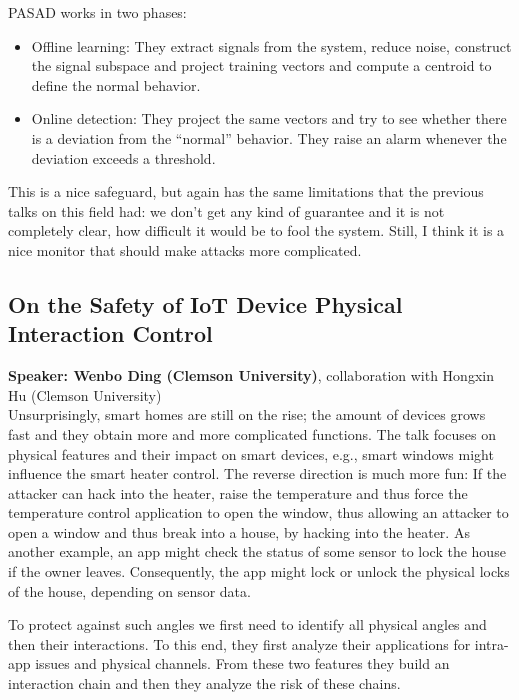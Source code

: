 \documentclass{article}
\begin{document}
PASAD works in two phases:\begin{itemize}
	\item Offline learning: They extract signals from the system, reduce noise, construct the signal subspace and project training vectors and compute a centroid to define the normal behavior.
	\item Online detection: They project the same vectors and try to see whether there is a deviation from the ``normal'' behavior. They raise an alarm whenever the deviation exceeds a threshold.
\end{itemize}

This is a nice safeguard, but again has the same limitations that the previous talks on this field had: we don't get any kind of guarantee and it is not completely clear, how difficult it would be to fool the system. Still, I think it is a nice monitor that should make attacks more complicated.

\subsection{On the Safety of IoT Device Physical Interaction Control}
\noindent\textbf{Speaker: Wenbo Ding (Clemson University)}, collaboration with Hongxin Hu (Clemson University)\\

Unsurprisingly, smart homes are still on the rise; the amount of devices grows fast and they obtain more and more complicated functions. The talk focuses on physical features and their impact on smart devices, e.g., smart windows might influence the smart heater control. The reverse direction is much more fun: If the attacker can hack into the heater, raise the temperature and thus force the temperature control application to open the window, thus allowing an attacker to open a window and thus break into a house, by hacking into the heater. As another example, an app might check the status of some sensor to lock the house if the owner leaves. Consequently, the app might lock or unlock the physical locks of the house, depending on sensor data.

To protect against such angles we first need to identify all physical angles and then their interactions. To this end, they first analyze their applications for intra-app issues and physical channels. From these two features they build an interaction chain and then they analyze the risk of these chains. 
\end{document}
